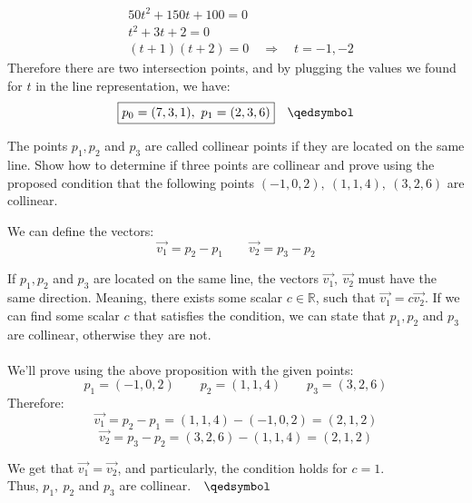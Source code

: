 \documentclass{article}
\begin{document}
\begin{enumerate}[(a)]
\begin{align*}
            &50t^2+150t+100=0\\
            &t^2+3t+2=0\\
            &(t+1)(t+2) = 0\quad\Rightarrow\quad t=-1,-2
        \end{align*}
        Therefore there are two intersection points, and by plugging the values we found for $t$ in the line representation, we have:
        $$\boxed{p_0 = (7,3,1),\ p_1=(2,3,6)}\quad\qedsymbol$$
        \newpage
        \begin{framed}
            \item The points $p_1,p_2$ and $p_3$ are called collinear points if they are located on the same line. Show how to determine if three points are collinear and prove using the proposed condition that the following points $(-1,0,2),\ (1,1,4),\ (3,2,6)$ are collinear.
        \end{framed}
        We can define the vectors:
        $$\vec{v_1} = p_2 - p_1\qquad \vec{v_2} = p_3 - p_2$$

        If $p_1,p_2$ and $p_3$ are located on the same line, the vectors $\vec{v_1},\ \vec{v_2}$ must have the same direction. Meaning, there exists some scalar $c\in\mathbb{R}$, such that $\vec{v_1} = c\vec{v_2}$. If we can find some scalar $c$ that satisfies the condition, we can state that $p_1,p_2$ and $p_3$ are collinear, otherwise they are not.\\\\
        We'll prove using the above proposition with the given points:
        $$p_1=(-1,0,2)\qquad p_2=(1,1,4)\qquad p_3=(3,2,6)$$
        Therefore:
        $$\vec{v_1} = p_2-p_1 = (1,1,4) - (-1,0,2) = (2,1,2)$$
        $$\vec{v_2} = p_3-p_2 = (3,2,6) - (1,1,4) = (2,1,2)$$

        We get that $\vec{v_1} = \vec{v_2}$, and particularly, the condition holds for $c=1$.\\
        Thus, $p_1,\ p_2$ and $p_3$ are collinear.$\quad\qedsymbol$
    \end{enumerate}
\end{document}
